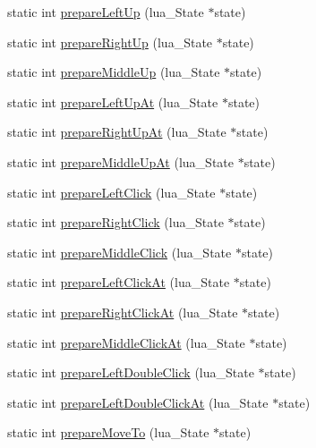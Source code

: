 \begin{DoxyCompactItemize}
static int \hyperlink{class_lua_api_engine_ad60b37dcca8dc42b6a70219b5b9fce95}{prepare\-Left\-Up} (lua\-\_\-\-State $\ast$state)
\item 
static int \hyperlink{class_lua_api_engine_a6777e46c87e999bd66c4ae349a9078cf}{prepare\-Right\-Up} (lua\-\_\-\-State $\ast$state)
\item 
static int \hyperlink{class_lua_api_engine_a846fe811b326260da13425a8b9b6f908}{prepare\-Middle\-Up} (lua\-\_\-\-State $\ast$state)
\item 
static int \hyperlink{class_lua_api_engine_a6e63e8131106f5e01d445a564e6569f5}{prepare\-Left\-Up\-At} (lua\-\_\-\-State $\ast$state)
\item 
static int \hyperlink{class_lua_api_engine_a63574f6087f18f635b1df170d51391a6}{prepare\-Right\-Up\-At} (lua\-\_\-\-State $\ast$state)
\item 
static int \hyperlink{class_lua_api_engine_aba8972c05819c262e4a9d8dec53b7e8f}{prepare\-Middle\-Up\-At} (lua\-\_\-\-State $\ast$state)
\item 
static int \hyperlink{class_lua_api_engine_aa4ec049683c5ca8fe5b317f9daa80cf2}{prepare\-Left\-Click} (lua\-\_\-\-State $\ast$state)
\item 
static int \hyperlink{class_lua_api_engine_a516e303be81f5691e5963e6a470a0d6c}{prepare\-Right\-Click} (lua\-\_\-\-State $\ast$state)
\item 
static int \hyperlink{class_lua_api_engine_a4644c161b4336ff836816a8ecbed562e}{prepare\-Middle\-Click} (lua\-\_\-\-State $\ast$state)
\item 
static int \hyperlink{class_lua_api_engine_a2109f8d536e8238941ea3d5254feee6e}{prepare\-Left\-Click\-At} (lua\-\_\-\-State $\ast$state)
\item 
static int \hyperlink{class_lua_api_engine_ac5b06389118f48d5e320b81c3c5ba5d0}{prepare\-Right\-Click\-At} (lua\-\_\-\-State $\ast$state)
\item 
static int \hyperlink{class_lua_api_engine_a3ecc218b3b366bde3d8c4e7c8f039f5e}{prepare\-Middle\-Click\-At} (lua\-\_\-\-State $\ast$state)
\item 
static int \hyperlink{class_lua_api_engine_ab545cafb77e825b84d787d0dbae34bc2}{prepare\-Left\-Double\-Click} (lua\-\_\-\-State $\ast$state)
\item 
static int \hyperlink{class_lua_api_engine_afb3a41719b02c24b851ff53a029207e6}{prepare\-Left\-Double\-Click\-At} (lua\-\_\-\-State $\ast$state)
\item 
static int \hyperlink{class_lua_api_engine_a700aa78e4509bca70b5b23cfe98ce7b3}{prepare\-Move\-To} (lua\-\_\-\-State $\ast$state)

\end{DoxyCompactItemize}
